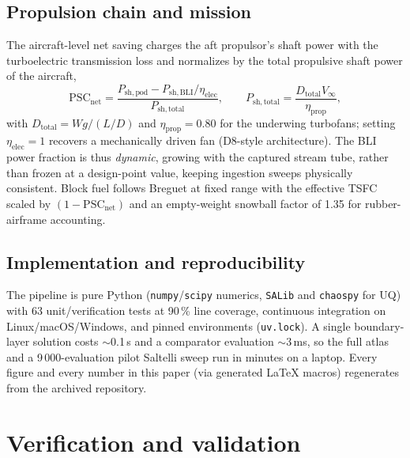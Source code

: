 \documentclass[10pt]{article}
\begin{document}
\subsection{Propulsion chain and mission}\label{sec:mission}

The aircraft-level net saving charges the aft propulsor's shaft power with
the turboelectric transmission loss and normalizes by the total propulsive
shaft power of the aircraft,
%
\begin{equation}
  \mathrm{PSC}_{\mathrm{net}} =
  \frac{P_{\mathrm{sh,pod}} - P_{\mathrm{sh,BLI}}/\eta_{\mathrm{elec}}}
       {P_{\mathrm{sh,total}}},
  \qquad
  P_{\mathrm{sh,total}} = \frac{D_{\mathrm{total}} V_\infty}{\eta_{\mathrm{prop}}},
  \label{eq:netpsc}
\end{equation}
%
with $D_{\mathrm{total}} = W g/(L/D)$ and $\eta_{\mathrm{prop}}=0.80$ for
the underwing turbofans; setting $\eta_{\mathrm{elec}}=1$ recovers a
mechanically driven fan (D8-style architecture). The BLI power fraction is
thus \emph{dynamic}, growing with the captured stream tube, rather
than frozen at a design-point value, keeping ingestion sweeps physically
consistent. Block fuel follows Breguet at fixed range with the effective
TSFC scaled by $(1-\mathrm{PSC}_{\mathrm{net}})$ and an empty-weight
snowball factor of 1.35 for rubber-airframe accounting.

\subsection{Implementation and reproducibility}

The pipeline is pure Python (\texttt{numpy}/\texttt{scipy} numerics,
\texttt{SALib} \citep{herman2017} and \texttt{chaospy} \citep{feinberg2015}
for UQ) with 63 unit/verification tests at 90\,\% line coverage, continuous
integration on Linux/macOS/Windows, and pinned environments
(\texttt{uv.lock}). A single boundary-layer solution costs $\sim$0.1\,s and
a comparator evaluation $\sim$3\,ms, so the full atlas and a
9\,000-evaluation pilot Saltelli sweep run in minutes on a laptop. Every figure
and every number in this paper (via generated \LaTeX{} macros) regenerates
from the archived repository.

\section{Verification and validation}\label{sec:vv}
\end{document}
